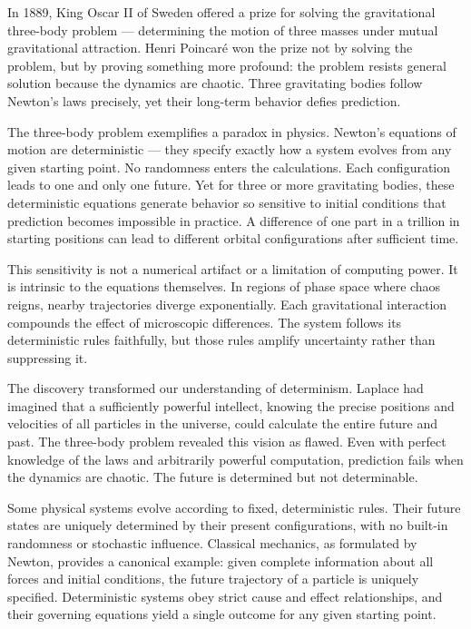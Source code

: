 In 1889, King Oscar II of Sweden offered a prize for solving the gravitational three-body problem — determining the motion of three masses under mutual gravitational attraction. Henri Poincaré won the prize not by solving the problem, but by proving something more profound: the problem resists general solution because the dynamics are chaotic. Three gravitating bodies follow Newton's laws precisely, yet their long-term behavior defies prediction.

The three-body problem exemplifies a paradox in physics. Newton's equations of motion are deterministic — they specify exactly how a system evolves from any given starting point. No randomness enters the calculations. Each configuration leads to one and only one future. Yet for three or more gravitating bodies, these deterministic equations generate behavior so sensitive to initial conditions that prediction becomes impossible in practice. A difference of one part in a trillion in starting positions can lead to different orbital configurations after sufficient time.

This sensitivity is not a numerical artifact or a limitation of computing power. It is intrinsic to the equations themselves. In regions of phase space where chaos reigns, nearby trajectories diverge exponentially. Each gravitational interaction compounds the effect of microscopic differences. The system follows its deterministic rules faithfully, but those rules amplify uncertainty rather than suppressing it.

The discovery transformed our understanding of determinism. Laplace had imagined that a sufficiently powerful intellect, knowing the precise positions and velocities of all particles in the universe, could calculate the entire future and past. The three-body problem revealed this vision as flawed. Even with perfect knowledge of the laws and arbitrarily powerful computation, prediction fails when the dynamics are chaotic. The future is determined but not determinable.

Some physical systems evolve according to fixed, deterministic rules. Their future states are uniquely determined by their present configurations, with no built-in randomness or stochastic influence. Classical mechanics, as formulated by Newton, provides a canonical example: given complete information about all forces and initial conditions, the future trajectory of a particle is uniquely specified. Deterministic systems obey strict cause and effect relationships, and their governing equations yield a single outcome for any given starting point.

